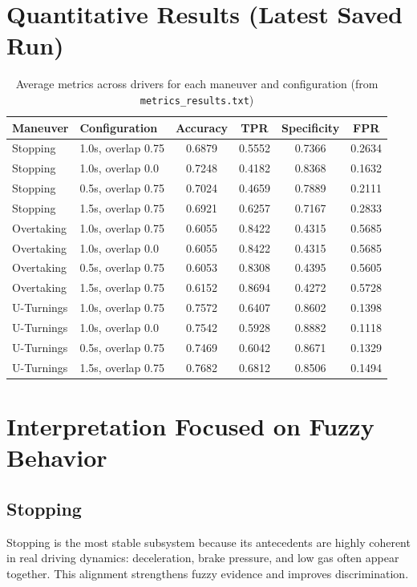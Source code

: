 \documentclass[11pt,a4paper]{article}
\begin{document}
\section{Quantitative Results (Latest Saved Run)}
\begin{table}[H]
\centering
\caption{Average metrics across drivers for each maneuver and configuration (from \texttt{metrics\_results.txt})}
\small
\begin{tabular}{p{2.2cm} p{4.2cm} c c c c}
\toprule
Maneuver & Configuration & Accuracy & TPR & Specificity & FPR \\
\midrule
Stopping & 1.0s, overlap 0.75 & 0.6879 & 0.5552 & 0.7366 & 0.2634 \\
Stopping & 1.0s, overlap 0.0  & 0.7248 & 0.4182 & 0.8368 & 0.1632 \\
Stopping & 0.5s, overlap 0.75 & 0.7024 & 0.4659 & 0.7889 & 0.2111 \\
Stopping & 1.5s, overlap 0.75 & 0.6921 & 0.6257 & 0.7167 & 0.2833 \\
\midrule
Overtaking & 1.0s, overlap 0.75 & 0.6055 & 0.8422 & 0.4315 & 0.5685 \\
Overtaking & 1.0s, overlap 0.0  & 0.6055 & 0.8422 & 0.4315 & 0.5685 \\
Overtaking & 0.5s, overlap 0.75 & 0.6053 & 0.8308 & 0.4395 & 0.5605 \\
Overtaking & 1.5s, overlap 0.75 & 0.6152 & 0.8694 & 0.4272 & 0.5728 \\
\midrule
U-Turnings & 1.0s, overlap 0.75 & 0.7572 & 0.6407 & 0.8602 & 0.1398 \\
U-Turnings & 1.0s, overlap 0.0  & 0.7542 & 0.5928 & 0.8882 & 0.1118 \\
U-Turnings & 0.5s, overlap 0.75 & 0.7469 & 0.6042 & 0.8671 & 0.1329 \\
U-Turnings & 1.5s, overlap 0.75 & 0.7682 & 0.6812 & 0.8506 & 0.1494 \\
\bottomrule
\end{tabular}
\end{table}

\section{Interpretation Focused on Fuzzy Behavior}
\subsection{Stopping}
Stopping is the most stable subsystem because its antecedents are highly coherent in real driving dynamics: deceleration, brake pressure, and low gas often appear together. This alignment strengthens fuzzy evidence and improves discrimination.
\end{document}
